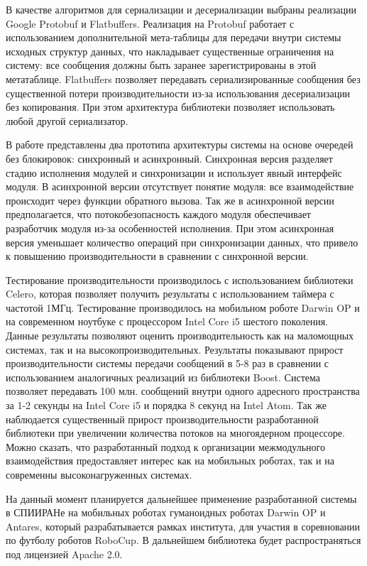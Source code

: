 В качестве алгоритмов для сериализации и десериализации выбраны 
реализации Google Protobuf и Flatbuffers. Реализация на Protobuf 
работает с использованием дополнительной мета-таблицы для 
передачи внутри системы исходных структур данных, что 
накладывает существенные ограничения на систему: все сообщения 
должны быть заранее зарегистрированы в этой метатаблице. 
Flatbuffers позволяет передавать сериализированные сообщения без 
существенной потери производительности из-за использования 
десериализации без копирования. При этом архитектура библиотеки 
позволяет использовать любой другой сериализатор.

В работе представлены два прототипа архитектуры системы на 
основе очередей без блокировок: синхронный и асинхронный. 
Синхронная версия разделяет стадию исполнения модулей и 
синхронизации и использует явный интерфейс модуля. В асинхронной 
версии отсутствует понятие модуля: все взаимодействие происходит 
через функции обратного вызова. Так же в асинхронной версии 
предполагается, что потокобезопасность каждого модуля 
обеспечивает разработчик модуля из-за особенностей исполнения. 
При этом асинхронная версия уменьшает количество операций при 
синхронизации данных, что привело к повышению производительности 
в сравнении с синхронной версии.

Тестирование производительности производилось с использованием 
библиотеки Celero, которая позволяет получить результаты с 
использованием таймера с частотой 1МГц. Тестирование 
производилось на мобильном роботе Darwin OP и на современном 
ноутбуке с процессором Intel Core i5 шестого поколения. Данные 
результаты позволяют оценить производительность как на 
маломощных системах, так и на высокопроизводительных. Результаты 
показывают прирост производительности системы передачи сообщений 
в 5-8 раз в сравнении с использованием аналогичных реализаций из 
библиотеки Boost. Система позволяет передавать 100 млн. 
сообщений внутри одного адресного пространства за 1-2 секунды на 
Intel Core i5 и порядка 8 секунд на Intel Atom. Так же 
наблюдается существенный прирост производительности 
разработанной библиотеки при увеличении количества потоков на 
многоядерном процессоре. Можно сказать, что разработанный подход 
к организации межмодульного взаимодействия предоставляет интерес 
как на мобильных роботах, так и на современны высоконагруженных 
системах.

На данный момент планируется дальнейшее применение разработанной системы в СПИИРАНе на мобильных роботах гуманоидных роботах Darwin OP и Antares, который разрабатывается рамках института, для участия в соревновании по футболу роботов RoboCup. В дальнейшем библиотека будет распространяться под лицензией Apache 2.0.